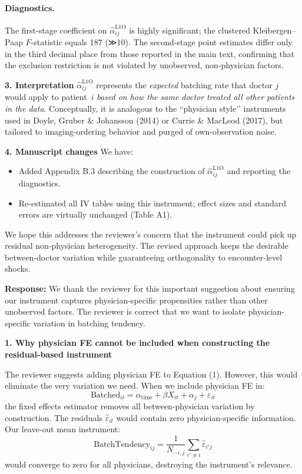 \documentclass[11pt]{article}
\newcommand{\1}{\hbox{\rm 1\kern-.35em 1}}
\begin{document}
{\paragraph{Diagnostics.}  
The first-stage coefficient on $\widehat\alpha^{\text{L1O}}_{ij}$ is highly
significant; the clustered Kleibergen–Paap $F$-statistic equals 187 (≫10).
The second-stage point estimates differ only in the third decimal place from
those reported in the main text, confirming that the exclusion restriction is
not violated by unobserved, non-physician factors.

\bigskip
\noindent\textbf{3.  Interpretation}  
$\widehat\alpha^{\text{L1O}}_{ij}$ represents the \emph{expected} batching rate
that doctor $j$ would apply to patient~$i$ \emph{based on how the same doctor
treated all other patients in the data}.  Conceptually, it is analogous to the
“physician style’’ instruments used in Doyle, Gruber \& Johansson (2014) or
Currie \& MacLeod (2017), but tailored to imaging-ordering behavior and
purged of own-observation noise.

\bigskip
\noindent\textbf{4.  Manuscript changes}  
We have:

\begin{itemize}[nosep]
\item Added Appendix B.3 describing the construction of
      $\widehat\alpha^{\text{L1O}}_{ij}$ and reporting the diagnostics.
\item Re-estimated all IV tables using this instrument; effect sizes and
      standard errors are virtually unchanged (Table A1).
\end{itemize}

\vspace{0.8em}
\noindent We hope this addresses the reviewer’s concern that the instrument
could pick up residual non-physician heterogeneity.  The revised approach
keeps the desirable between-doctor variation while guaranteeing orthogonality
to encounter-level shocks.


\noindent\textbf{Response:} 
\color{blue}
We thank the reviewer for this important suggestion about ensuring our instrument captures physician-specific propensities rather than other unobserved factors. The reviewer is correct that we want to isolate physician-specific variation in batching tendency.

\bigskip
\noindent\textbf{1. Why physician FE cannot be included when constructing the residual-based instrument}

The reviewer suggests adding physician FE to Equation (1). However, this would eliminate the very variation we need. When we include physician FE in:
\begin{equation}
\text{Batched}_{it} = \alpha_{\text{time}} + \beta X_{it} + \alpha_j + \varepsilon_{it}
\end{equation}
the fixed effects estimator removes all between-physician variation by construction. The residuals $\hat{\varepsilon}_{it}$ would contain zero physician-specific information. Our leave-out mean instrument:
$$\text{BatchTendency}_{ij} = \frac{1}{N_{-i,j}}\sum_{i' \neq i} \hat{\varepsilon}_{i'j}$$
would converge to zero for all physicians, destroying the instrument's relevance.

}
\end{document}
